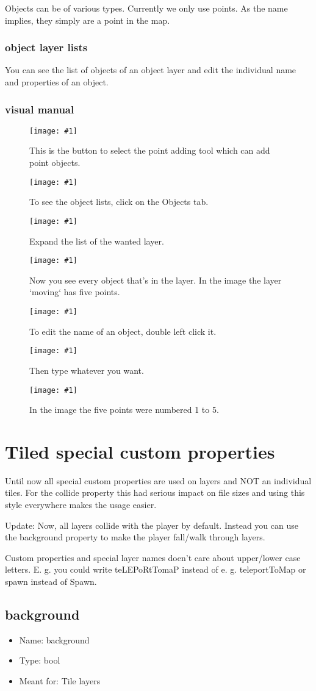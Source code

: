 \documentclass{article}
\newcommand{\erklaerbild}[2]{
	\begin{figure}[H]
		\center
		\texttt{[image: \#1]}
		\caption{#2}
	\end{figure}
}
\begin{document}
Objects can be of various types. Currently we only use points. As the name implies, they simply are a point in the map.

\subsubsection{object layer lists}
You can see the list of objects of an object layer and edit the individual name and properties of an object.

\subsubsection{visual manual}
\erklaerbild
	{insert_point_edit.png}
	{This is the button to select the point adding tool which can add point objects.}

\erklaerbild
	{object_list_1_edit.png}
	{To see the object lists, click on the Objects tab.}

\erklaerbild
	{object_list_2_edit.png}
	{Expand the list of the wanted layer.}

\erklaerbild
	{object_list_3.png}
	{Now you see every object that's in the layer. In the image the layer `moving` has five points.}

\erklaerbild
	{object_list_4_edit.png}
	{To edit the name of an object, double left click it.}

\erklaerbild
	{object_list_5.png}
	{Then type whatever you want.}

\erklaerbild
	{object_list_6.png}
	{In the image the five points were numbered 1 to 5.}

\section{Tiled special custom properties}
Until now all special custom properties are used on layers and NOT an individual tiles. For the collide property this had serious impact on file sizes and using this style everywhere makes the usage easier.

Update: Now, all layers collide with the player by default. Instead you can use the background property to make the player fall/walk through layers.

Custom properties and special layer names doen't care about upper/lower case letters. E. g. you could write teLEPoRtTomaP instead of e. g. teleportToMap or spawn instead of Spawn.

\subsection{background}
\begin{itemize}
	\item Name: background
	\item Type: bool
	\item Meant for: Tile layers
\end{itemize}
\end{document}
